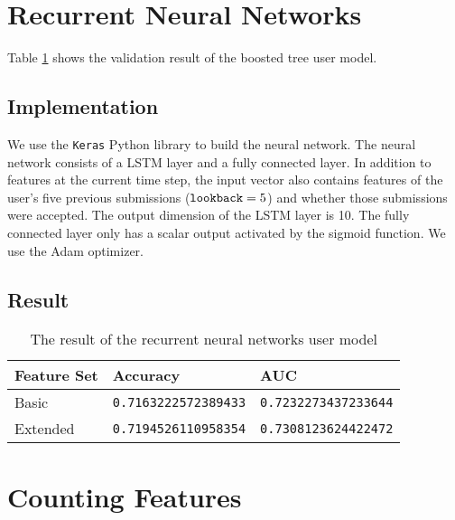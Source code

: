 \section{Recurrent Neural Networks}

    Table \ref{table:rnn result} shows the validation result of the boosted tree user model.

    \subsection{Implementation}

        We use the \verb|Keras|\cite{chollet2015keras} Python library to build the neural network.
        The neural network consists of a LSTM layer and a fully connected layer.
        In addition to features at the current time step,
        the input vector also contains features of the user's five previous submissions ($\verb|lookback| = 5$)
        and whether those submissions were accepted.
        The output dimension of the LSTM layer is 10.
        The fully connected layer only has a scalar output activated by the sigmoid function.
        We use the Adam optimizer\cite{kingma_adam:_2014}.

    \subsection{Result}

        \begin{table}[hpbt]
        \centering
        \begin{tabular}{lll}
            \hline
            Feature Set & Accuracy & AUC \\
            \hline
            Basic    & \verb|0.7163222572389433| & \verb|0.7232273437233644| \\
            Extended & \verb|0.7194526110958354| & \verb|0.7308123624422472| \\
            \hline
        \end{tabular}
        \caption{The result of the recurrent neural networks user model}
        \label{table:rnn result}
        \end{table}

\section{Counting Features}












